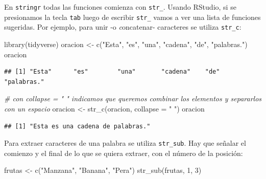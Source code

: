 \documentclass[
]{book}
\newenvironment{Shaded}{\begin{snugshade}}{\end{snugshade}}
\newcommand{\AttributeTok}[1]{\textcolor[rgb]{0.77,0.63,0.00}{#1}}
\newcommand{\CommentTok}[1]{\textcolor[rgb]{0.56,0.35,0.01}{\textit{#1}}}
\newcommand{\DecValTok}[1]{\textcolor[rgb]{0.00,0.00,0.81}{#1}}
\newcommand{\FunctionTok}[1]{\textcolor[rgb]{0.00,0.00,0.00}{#1}}
\newcommand{\NormalTok}[1]{#1}
\newcommand{\OtherTok}[1]{\textcolor[rgb]{0.56,0.35,0.01}{#1}}
\newcommand{\StringTok}[1]{\textcolor[rgb]{0.31,0.60,0.02}{#1}}
\begin{document}
En \texttt{stringr} todas las funciones comienza con \texttt{str\_}. Usando RStudio, si se presionamos la tecla \texttt{tab} luego de escribir \texttt{str\_} vamos a ver una lista de funciones sugeridas. Por ejemplo, para unir -o \emph{c}oncatenar- caracteres se utiliza \texttt{str\_c}:

\begin{Shaded}
\begin{Highlighting}[]
\FunctionTok{library}\NormalTok{(tidyverse)}
\NormalTok{oracion }\OtherTok{\textless{}{-}} \FunctionTok{c}\NormalTok{(}\StringTok{"Esta"}\NormalTok{, }\StringTok{"es"}\NormalTok{, }\StringTok{"una"}\NormalTok{, }\StringTok{"cadena"}\NormalTok{, }\StringTok{"de"}\NormalTok{, }\StringTok{"palabras."}\NormalTok{)}
\NormalTok{oracion}
\end{Highlighting}
\end{Shaded}

\begin{verbatim}
## [1] "Esta"      "es"        "una"       "cadena"    "de"        "palabras."
\end{verbatim}

\begin{Shaded}
\begin{Highlighting}[]
\CommentTok{\# con \textasciigrave{}collapse = " "\textasciigrave{} indicamos que queremos combinar los elementos y separarlos con un espacio}
\NormalTok{oracion }\OtherTok{\textless{}{-}} \FunctionTok{str\_c}\NormalTok{(oracion, }\AttributeTok{collapse =} \StringTok{" "}\NormalTok{) }
\NormalTok{oracion}
\end{Highlighting}
\end{Shaded}

\begin{verbatim}
## [1] "Esta es una cadena de palabras."
\end{verbatim}

Para extraer caracteres de una palabra se utiliza \texttt{str\_sub}. Hay que señalar el comienzo y el final de lo que se quiera extraer, con el número de la posición:

\begin{Shaded}
\begin{Highlighting}[]
\NormalTok{frutas }\OtherTok{\textless{}{-}} \FunctionTok{c}\NormalTok{(}\StringTok{"Manzana"}\NormalTok{, }\StringTok{"Banana"}\NormalTok{, }\StringTok{"Pera"}\NormalTok{)}
\FunctionTok{str\_sub}\NormalTok{(frutas, }\DecValTok{1}\NormalTok{, }\DecValTok{3}\NormalTok{)}
\end{Highlighting}
\end{Shaded}
\end{document}
